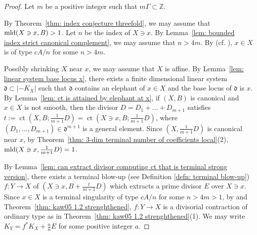 \documentclass[11pt]{amsart}
\numberwithin{equation}{section}
\newcommand{\Zz}{\mathbb{Z}}
\newcommand{\mld}{{\rm{mld}}}
\newcommand{\ct}{\operatorname{ct}}
\newcommand{\Ii}{{\Gamma}}
\theoremstyle{definition}
\theoremstyle{definition}
\begin{document}
\begin{proof}
Let $m$ be a positive integer such that $m\Ii\subset \Zz$. 

By Theorem~\ref{thm: index conjecture threefold}, we may assume that $\mld(X\ni x,B)>1$. Let $n$ be the index of $X\ni x$. By Lemma~\ref{lem: bounded index strict canonical complement}, we may assume that $n>4m$. By \cite[(6.1) Theorem]{Rei87} (cf. \cite[Theorems 12,23,25]{Mor85}),  $x\in X$ is of type $cA/n$ for some $n>4m$.


Possibly shrinking $X$ near $x$, we may assume that $X$ is affine. By Lemma~\ref{lem: linear system base locus x}, there exists a finite dimensional linear system $\mathfrak{d}\subset |-K_X|$ such that $\mathfrak{d}$ contains an elephant of $x\in X$ and the base locus of ${{\mathfrak {d}}}$ is $x$. By Lemma~\ref{lem: ct is attained by elephant at x}, if $(X,B)$ is canonical and $x\in X$ is not smooth, then the divisor $D=D_1+\dots+D_{m+1}$ satisfies $t:=\ct(X,B;\frac{1}{m+1}D)=\ct(X\ni x, B;\frac{1}{m+1}D)$, where $(D_1,\dots,D_{m+1})\in \mathfrak{d}^{m+1}$ is a general element. Since $(X, \frac{1}{m+1}D)$ is canonical near $x$, by Theorem~\ref{thm: 3-dim terminal number of coefficients local}(2), $\mld(X\ni x,\frac{1}{m+1}D)=1$.


By Lemma~\ref{lem: can extract divisor computing ct that is terminal strong version}, there exists a terminal blow-up (see Definition \ref{defn: terminal blow-up}) $f: Y\to X$ of $(X\ni x, B+\frac{t}{m+1}D)$ which extracts a prime divisor $E$ over $X\ni x$. Since $x\in X$ is a terminal singularity of type $cA/n$ for some $n> 4m>1$, by \cite[Theorem~1.3]{Kaw05} and Theorem~\ref{thm: kaw05 1.2 strenghthened}, $f: Y\to X$ is a divisorial contraction of ordinary type as in Theorem~\ref{thm: kaw05 1.2 strenghthened}(1). We may write $K_Y=f^*K_X+\frac{a}{n}E$ for some positive integer $a$. %


\end{proof}
\end{document}
